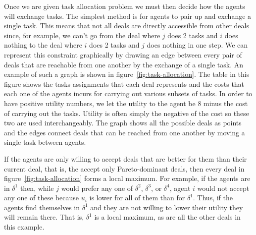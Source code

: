 Once we are given task allocation problem we must then decide how the
agents will exchange tasks. The simplest method is for agents to pair
up and exchange a single task. This means that not all deals are
directly accessible from other deals since, for example, we can't go
from the deal where $j$ does 2 tasks and $i$ does nothing to the deal
where $i$ does 2 tasks and $j$ does nothing in one step. We can
represent this constraint graphically by drawing an edge between every
pair of deals that are reachable from one another by the exchange of a
single task. An example of such a graph is shown in
figure~\ref{fig:task-allocation}.  The table in this figure shows the
tasks assignments that each deal represents and the costs that each
one of the agents incurs for carrying out various subsets of tasks. In
order to have positive utility numbers, we let the utility to the
agent be 8 minus the cost of carrying out the tasks.  Utility is often
simply the negative of the cost so these two are used interchangeably.
The graph shows all the possible deals as points and the edges connect
deals that can be reached from one another by moving a single task
between agents.

%

If the agents are only willing to accept deals that are better for
them than their current deal, that is, the accept only Pareto-dominant
deals, then every deal in figure~\ref{fig:task-allocation} forms a
local maximum. For example, if the agents are in $\delta^1$ then,
while $j$ would prefer any one of $\delta^2$, $\delta^3$, or
$\delta^4$, agent $i$ would not accept any one of these because $u_i$
is lower for all of them than for $\delta^1$. Thus, if the agents find
themselves in $\delta^1$ and they are not willing to lower their
utility they will remain there. That is, $\delta^1$ is a local
maximum, as are all the other deals in this example.


